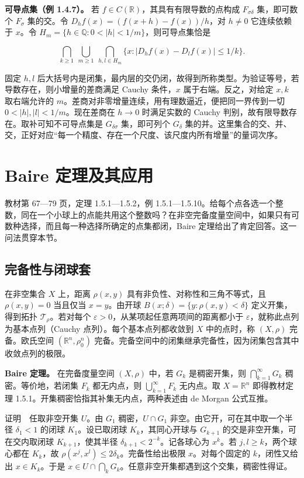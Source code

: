 \documentclass[11pt,a4paper]{article}
\begin{document}
\textbf{可导点集（例 1.4.7）。} 若 \(f\in C(\mathbb R)\)，其具有有限导数的点构成 \(F_{\sigma\delta}\) 集，即可数个 \(F_\sigma\) 集的交。令 \(D_hf(x)=(f(x+h)-f(x))/h\)，对 \(h\ne0\) 它连续依赖于 \(x\)。令 \(H_m=\{h\in\mathbb Q:0<|h|<1/m\}\)，则可导点集恰是

\[
\bigcap_{k\ge1}\ \bigcup_{m\ge1}\
\bigcap_{h,l\in H_m}
\{x:|D_hf(x)-D_lf(x)|\le 1/k\}.
\]

固定 \(h,l\) 后大括号内是闭集，最内层的交仍闭，故得到所称类型。为验证等号，若导数存在，则小增量的差商满足 Cauchy 条件，\(x\) 属于右端。反之，对给定 \(x,k\) 取右端允许的 \(m\)。差商对非零增量连续，用有理数逼近，便把同一界传到一切 \(0<|h|,|l|<1/m\)。现在差商在 \(h\to0\) 时满足实数的 Cauchy 判别，故有限导数存在。取补可知不可导点集是 \(G_{\delta\sigma}\) 集，即可列个 \(G_\delta\) 集的并。这里集合的交、并、交，正好对应``每一个精度、存在一个尺度、该尺度内所有增量''的量词次序。
\section{Baire 定理及其应用}

教材第 67---79 页，定理 1.5.1---1.5.2，例 1.5.1---1.5.10。给每个点各选一个整数，同在一个小球上的点能共用这个整数吗？在非空完备度量空间中，如果只有可数种选择，而且每一种选择所确定的点集都闭，Baire 定理给出了肯定回答。这一问法贯穿本节。

\subsection{完备性与闭球套}

在非空集合 \(X\) 上，距离 \(\rho(x,y)\) 具有非负性、对称性和三角不等式，且 \(\rho(x,y)=0\) 当且仅当 \(x=y\)。由开球 \(B(x;\delta)=\{y:\rho(x,y)<\delta\}\) 定义开集，得到拓扑 \(\mathcal T_\rho\)。若对每个 \(\varepsilon>0\)，从某项起任意两项间的距离都小于 \(\varepsilon\)，就称此点列为基本点列（Cauchy 点列）。每个基本点列都收敛到 \(X\) 中的点时，称 \((X,\rho)\) 完备。欧氏空间 \((\mathbb R^n,\rho_0^n)\) 完备。完备空间中的闭集继承完备性，因为闭集包含其中收敛点列的极限。

\textbf{Baire 定理。} 在完备度量空间 \((X,\rho)\) 中，若 \(G_k\) 是稠密开集，则 \(\bigcap_{k=1}^{\infty}G_k\) 稠密。等价地，若闭集 \(F_k\) 都无内点，则 \(\bigcup_{k=1}^{\infty}F_k\) 无内点。取 \(X=\mathbb R^n\) 即得教材定理 1.5.1。开集稠密恰指其补集无内点，两种表述由 de Morgan 公式互推。

证明　任取非空开集 \(U\)。由 \(G_1\) 稠密，\(U\cap G_1\) 非空。由它开，可在其中取一个半径 \(\delta_1<1\) 的闭球 \(K_1\)。设已取闭球 \(K_k\)，其同心开球与 \(G_{k+1}\) 的交是非空开集，可在交内取闭球 \(K_{k+1}\)，使其半径 \(\delta_{k+1}<2^{-k}\)。记各球心为 \(x^k\)。若 \(j,l\ge k\)，两个球心都在 \(K_k\)，故 \(\rho(x^j,x^l)\le 2\delta_k\)。完备性给出极限 \(x\)。对每个固定的 \(k\)，闭性又给出 \(x\in K_k\)。于是 \(x\in U\cap\bigcap_k G_k\)。任意非空开集都遇到这个交集，稠密性得证。
\end{document}
